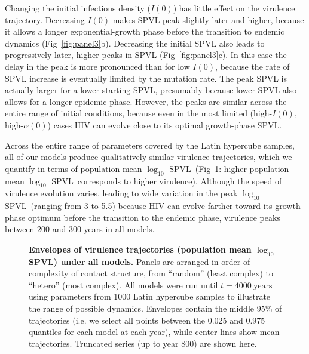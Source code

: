 \documentclass[10pt,letterpaper]{article}
\renewcommand{\figurename}{Fig}
\newcommand{\Lspvl}{$\log_{10}$ SPVL}
\begin{document}
Changing the initial infectious density ($I(0)$) has little effect on the virulence trajectory. Decreasing $I(0)$ makes SPVL peak slightly later and higher, because it allows a longer exponential-growth phase before the transition to endemic dynamics (\figurename~\ref{fig:panel3}b). Decreasing the initial SPVL also leads to progressively later, higher peaks in SPVL (\figurename~\ref{fig:panel3}c). In this case the delay in the peak is more pronounced than for low $I(0)$, because the rate of SPVL increase is eventually limited by the mutation rate. The peak SPVL is actually larger for a lower starting SPVL, presumably because lower SPVL also allows for a longer epidemic phase. However, the peaks are similar across the entire range of initial conditions, because even in the most limited (high-$I(0)$, high-$\alpha(0)$) cases HIV can evolve close to its
optimal growth-phase SPVL.

Across the entire range of parameters covered by the
Latin hypercube samples, all
of our models produce qualitatively similar
virulence trajectories, which we quantify in terms of population mean
\Lspvl\ (\figurename~\ref{fig:virtraj}: higher population mean
\Lspvl\ corresponds to higher virulence). Although the speed of
virulence evolution varies, leading to wide variation in the peak
\Lspvl\ (ranging from 3 to 5.5) because HIV can evolve farther toward
its growth-phase optimum before the transition to the
endemic phase, virulence peaks between 200 and
300 years in all models.

\begin{figure}[!ht]
\caption{\textbf{Envelopes of virulence trajectories (population mean \Lspvl) under all models.}
Panels are arranged in order of complexity of contact structure, from 
``random'' (least complex) to ``hetero'' (most complex).
All models were run until $t=4000~\textrm{years}$ using parameters from 1000 Latin hypercube samples to illustrate the range of possible dynamics. Envelopes contain the middle 95\% of trajectories (i.e. we select all points between the 0.025 and 0.975 quantiles for each model at each year), while center lines show mean trajectories. Truncated series (up to year 800) are shown here.}
\label{fig:virtraj}
\end{figure}
\end{document}
